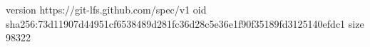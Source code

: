 version https://git-lfs.github.com/spec/v1
oid sha256:73d11907d44951cf6538489d281fc36d28c5e36e1f90f35189fd3125140efdc1
size 98322
